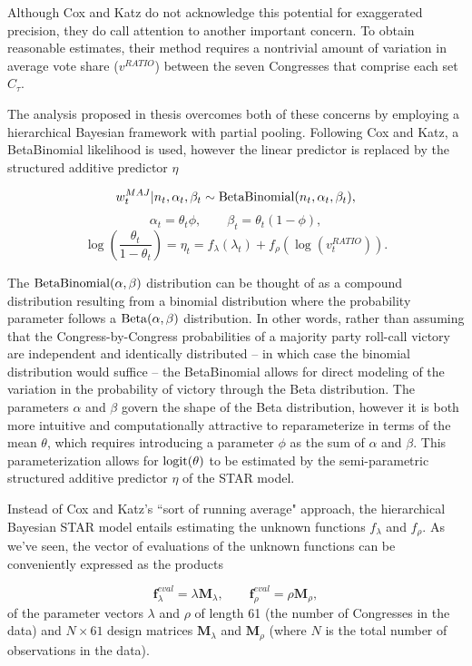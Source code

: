 Although Cox and Katz do not acknowledge this potential for exaggerated precision, they do call attention to another important concern. To obtain reasonable estimates, their method requires a nontrivial amount of variation in average vote share ($v^{RATIO}$) between the seven Congresses that comprise each set $C_\tau$. 

The analysis proposed in thesis overcomes both of these concerns by employing a hierarchical Bayesian framework with partial pooling. Following Cox and Katz, a BetaBinomial likelihood is used, however the linear predictor is replaced by the structured additive predictor $\eta$

$$w_t^{MAJ} | n_t, \alpha_t, \beta_t \sim {\rm BetaBinomial}(n_t, \alpha_t, \beta_t),$$
$$ \alpha_t = \theta_t \phi, \qquad \beta_t = \theta_t (1 - \phi),$$
$$ \log\left({\frac{\theta_t}{1 - \theta_t}}\right) = \eta_t = f_{\lambda}(\lambda_t) + f_\rho \left(\log{(v_t^{RATIO})}\right).$$

The ${\rm BetaBinomial}(\alpha,\beta)$ distribution can be thought of as a compound distribution resulting from a binomial distribution where the probability parameter follows a ${\rm Beta}(\alpha,\beta)$ distribution. In other words, rather than assuming that the Congress-by-Congress probabilities of a majority party roll-call victory are independent and identically distributed -- in which case the binomial distribution would suffice -- the BetaBinomial  allows for direct modeling of the variation in the probability of victory through the Beta distribution. The parameters $\alpha$ and $\beta$ govern the shape of the Beta distribution, however it is both more intuitive and computationally attractive to reparameterize in terms of the mean $\theta$, which requires introducing a parameter $\phi$ as the sum of $\alpha$ and $\beta$.  This parameterization allows for ${\rm logit}(\theta)$ to be estimated by the semi-parametric structured additive predictor $\eta$ of the STAR model. 

Instead of Cox and Katz's ``sort of running average" approach, the hierarchical Bayesian STAR model entails estimating the unknown functions $f_\lambda$ and $f_\rho$. As we've seen, the vector of evaluations of the unknown functions can be conveniently expressed as the products 

{\singlespacing
$$
\mathbf{f}^{eval}_\lambda = \lambda \mathbf{M}_\lambda, 
\qquad 
\mathbf{f}^{eval}_\rho = \rho \mathbf{M}_\rho, 
$$
}
%
\noindent of the parameter vectors $\lambda$ and $\rho$ of length 61 (the number of Congresses in the data) and  $N \times 61$ design matrices  $\mathbf{M}_\lambda$ and  $\mathbf{M}_\rho$ (where $N$ is the total number of observations in the data).   

